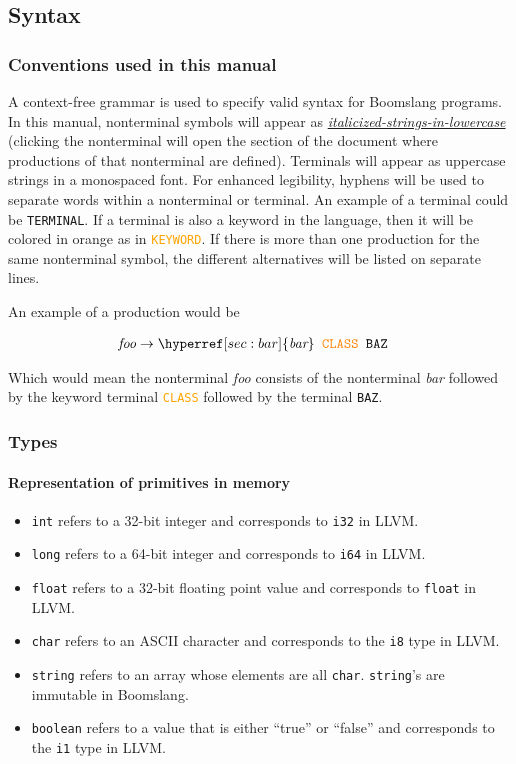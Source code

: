\documentclass{article}
\begin{document}
\subsection{Syntax}
\subsubsection{Conventions used in this manual}
\label{sec:italicized-strings-in-lowercase}
\label{sec:bar}
A context-free grammar is used to specify valid syntax for Boomslang programs. In this manual, nonterminal symbols will appear as \hyperref[sec:italicized-strings-in-lowercase]{\textit{italicized-strings-in-lowercase}} (clicking the nonterminal will open the section of the document where productions of that nonterminal are defined). Terminals will appear as uppercase strings in a monospaced font. For enhanced legibility, hyphens will be used to separate words within a nonterminal or terminal. An example of a terminal could be  \texttt{TERMINAL}. If a terminal is also a keyword in the language, then it will be colored in orange as in \textcolor{orange}{\texttt{KEYWORD}}. If there is more than one production for the same nonterminal symbol, the different alternatives will be listed on separate lines.

An example of a production would be

\begin{align*}
    \textit{foo} &\to \hyperref[sec:bar]{\textit{bar}} \texttt{ } \textcolor{orange}{\texttt{CLASS}} \texttt{ } \texttt{BAZ}
\end{align*}

Which would mean the nonterminal \textit{foo} consists of the nonterminal \textit{bar} followed by the keyword terminal \textcolor{orange}{\texttt{CLASS}} followed by the terminal \texttt{BAZ}.

\subsubsection{Types}
\paragraph{Representation of primitives in memory}
\begin{itemize}
    \item \texttt{int} refers to a 32-bit integer and corresponds to \texttt{i32} in LLVM.
    \item \texttt{long} refers to a 64-bit integer and corresponds to \texttt{i64} in LLVM.
    \item \texttt{float} refers to a 32-bit floating point value and corresponds to \texttt{float} in LLVM.
    \item \texttt{char} refers to an ASCII character and corresponds to the \texttt{i8} type in LLVM.
    \item \texttt{string} refers to an array whose elements are all \texttt{char}. \texttt{string}'s are immutable in Boomslang.
    \item \texttt{boolean} refers to a value that is either ``true'' or ``false'' and corresponds to the \texttt{i1} type in LLVM.
\end{itemize}
\end{document}
